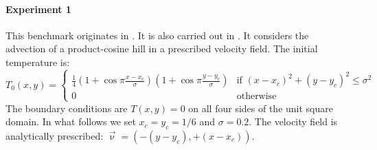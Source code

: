 


\paragraph{Experiment 1}

This benchmark originates in \cite{dohu03}. It is also carried out in \cite{bepo10}.
It considers the advection of a product-cosine hill
in a prescribed velocity field. The initial temperature is:
\begin{equation}
T_0(x,y)=
\left\{
\begin{array}{cc}
\frac{1}{4}
\left(1+\cos \pi\frac{x-x_c}{\sigma}\right)
\left(1+\cos \pi\frac{y-y_c}{\sigma}\right)
& \text{if } (x-x_c)^2+(y-y_c)^2\leq \sigma^2 \\
0 & \text{otherwise}
\end{array}
\right.
\end{equation}
The boundary conditions are $T(x,y)=0$ on all four sides of the unit square domain. In what follows we set $x_c=y_c=1/6$ and $\sigma=0.2$.  The velocity field is analytically prescribed: $\vec\upnu=(-(y-y_c),+(x-x_c))$.

